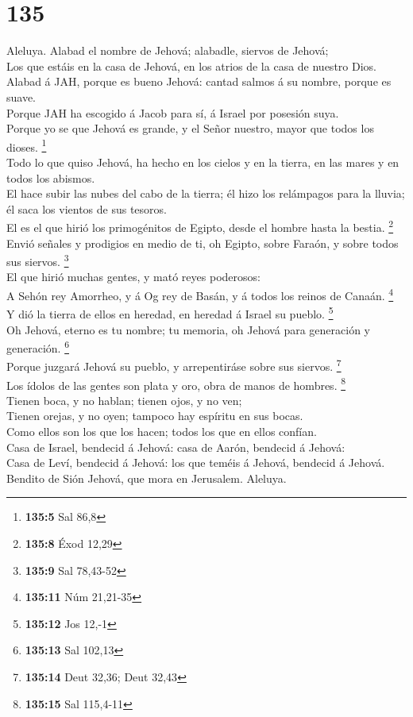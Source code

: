 \hypertarget{section-134}{%
\section{135}\label{section-134}}

 Aleluya. Alabad el nombre de Jehová; alabadle, siervos de
Jehová;\\
 Los que estáis en la casa de Jehová, en los atrios de la
casa de nuestro Dios.\\
 Alabad á JAH, porque es bueno Jehová: cantad salmos á su
nombre, porque es suave.\\
 Porque JAH ha escogido á Jacob para sí, á Israel por
posesión suya.\\
 Porque yo se que Jehová es grande, y el Señor nuestro,
mayor que todos los dioses. \footnote{\textbf{135:5} Sal 86,8}\\
 Todo lo que quiso Jehová, ha hecho en los cielos y en la
tierra, en las mares y en todos los abismos.\\
 El hace subir las nubes del cabo de la tierra; él hizo los
relámpagos para la lluvia; él saca los vientos de sus tesoros.\\
 El es el que hirió los primogénitos de Egipto, desde el
hombre hasta la bestia. \footnote{\textbf{135:8} Éxod 12,29}\\
 Envió señales y prodigios en medio de ti, oh Egipto, sobre
Faraón, y sobre todos sus siervos. \footnote{\textbf{135:9} Sal 78,43-52}\\
 El que hirió muchas gentes, y mató reyes poderosos:\\
 A Sehón rey Amorrheo, y á Og rey de Basán, y á todos los
reinos de Canaán. \footnote{\textbf{135:11} Núm 21,21-35}\\
 Y dió la tierra de ellos en heredad, en heredad á Israel
su pueblo. \footnote{\textbf{135:12} Jos 12,-1}\\
 Oh Jehová, eterno es tu nombre; tu memoria, oh Jehová para
generación y generación. \footnote{\textbf{135:13} Sal 102,13}\\
 Porque juzgará Jehová su pueblo, y arrepentiráse sobre sus
siervos. \footnote{\textbf{135:14} Deut 32,36; Deut 32,43}\\
 Los ídolos de las gentes son plata y oro, obra de manos de
hombres. \footnote{\textbf{135:15} Sal 115,4-11}\\
 Tienen boca, y no hablan; tienen ojos, y no ven;\\
 Tienen orejas, y no oyen; tampoco hay espíritu en sus
bocas.\\
 Como ellos son los que los hacen; todos los que en ellos
confían.\\
 Casa de Israel, bendecid á Jehová: casa de Aarón, bendecid
á Jehová:\\
 Casa de Leví, bendecid á Jehová: los que teméis á Jehová,
bendecid á Jehová.\\
 Bendito de Sión Jehová, que mora en Jerusalem. Aleluya.

